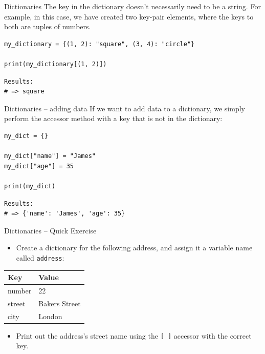 \documentclass[10pt]{beamer}
\begin{document}
\begin{frame}[label={sec:org90998e1},fragile]{Dictionaries}
 The key in the dictionary doesn't necessarily need to be a string. For example, in
this case, we have created two key-pair elements, where the keys to both are tuples
of numbers.

\begin{verbatim}
my_dictionary = {(1, 2): "square", (3, 4): "circle"}

print(my_dictionary[(1, 2)])
\end{verbatim}

\begin{verbatim}
Results: 
# => square
\end{verbatim}
\end{frame}

\begin{frame}[label={sec:org263c697},fragile]{Dictionaries -- adding data}
 If we want to add data to a dictionary, we simply perform the accessor method with a
key that is not in the dictionary:

\begin{verbatim}
my_dict = {}

my_dict["name"] = "James"
my_dict["age"] = 35

print(my_dict)
\end{verbatim}

\begin{verbatim}
Results: 
# => {'name': 'James', 'age': 35}
\end{verbatim}
\end{frame}

\begin{frame}[label={sec:org389989a},fragile]{Dictionaries -- Quick Exercise}
 \begin{itemize}
\item Create a dictionary for the following address, and assign it a variable name
called \texttt{address}:
\end{itemize}

\begin{center}
\begin{tabular}{ll}
Key & Value\\
\hline
number & 22\\
street & Bakers Street\\
city & London\\
\end{tabular}
\end{center}

\begin{itemize}
\item Print out the address's street name using the \texttt{[ ]} accessor with the correct key.
\end{itemize}
\end{frame}
\end{document}
